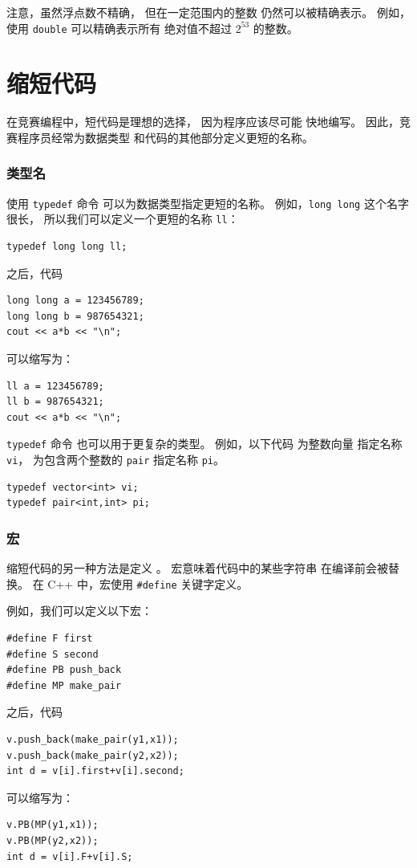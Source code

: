 注意，虽然浮点数不精确，
但在一定范围内的整数
仍然可以被精确表示。
例如，使用 \texttt{double}
可以精确表示所有
绝对值不超过 $2^{53}$ 的整数。

\section{缩短代码}

在竞赛编程中，短代码是理想的选择，
因为程序应该尽可能
快地编写。
因此，竞赛程序员经常为数据类型
和代码的其他部分定义更短的名称。

\subsubsection{类型名}
使用 \texttt{typedef} 命令
可以为数据类型指定更短的名称。
例如，\texttt{long long} 这个名字很长，
所以我们可以定义一个更短的名称 \texttt{ll}：
\begin{lstlisting}
typedef long long ll;
\end{lstlisting}
之后，代码
\begin{lstlisting}
long long a = 123456789;
long long b = 987654321;
cout << a*b << "\n";
\end{lstlisting}
可以缩写为：
\begin{lstlisting}
ll a = 123456789;
ll b = 987654321;
cout << a*b << "\n";
\end{lstlisting}

\texttt{typedef} 命令
也可以用于更复杂的类型。
例如，以下代码
为整数向量
指定名称 \texttt{vi}，
为包含两个整数的
\texttt{pair} 指定名称 \texttt{pi}。
\begin{lstlisting}
typedef vector<int> vi;
typedef pair<int,int> pi;
\end{lstlisting}

\subsubsection{宏}
缩短代码的另一种方法是定义
。
宏意味着代码中的某些字符串
在编译前会被替换。
在 C++ 中，宏使用
\texttt{\#define} 关键字定义。

例如，我们可以定义以下宏：
\begin{lstlisting}
#define F first
#define S second
#define PB push_back
#define MP make_pair
\end{lstlisting}
之后，代码
\begin{lstlisting}
v.push_back(make_pair(y1,x1));
v.push_back(make_pair(y2,x2));
int d = v[i].first+v[i].second;
\end{lstlisting}
可以缩写为：
\begin{lstlisting}
v.PB(MP(y1,x1));
v.PB(MP(y2,x2));
int d = v[i].F+v[i].S;
\end{lstlisting}

